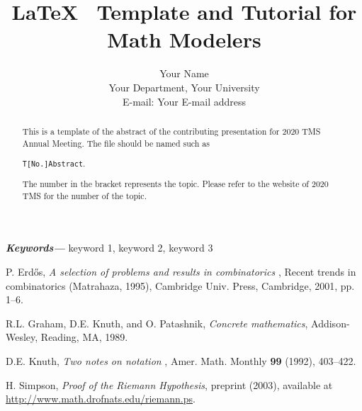\documentclass[12pt]{article}   %
\providecommand{\keywords}[1]
{
  \small	
  \textbf{\textit{Keywords---}} #1
}
\begin{document}

\title{  LaTeX \, Template and Tutorial for Math Modelers  }

\author{Your Name\\
        \small{ Your Department, Your University }\\
        \small{ E-mail: Your E-mail address }
        }
        
\date{} %

\maketitle

\thispagestyle{empty}

\begin{abstract}
This is a template of the abstract of the contributing presentation for 2020 TMS Annual Meeting. The file should be named such as
 \begin{center}{\tt T[No.]\textunderscore Abstract}.\end{center}
 \noindent The number in the bracket represents the topic. Please refer to the website of 2020 TMS for the number of the topic.\\
\end{abstract}

\keywords{   keyword 1, keyword 2, keyword 3    }

\begin{thebibliography}{99}  %
\bibitem{ } 
P. Erd\H os, 
\emph{ A selection of problems and results in combinatorics },  
Recent trends in combinatorics (Matrahaza, 1995),  
Cambridge Univ. Press, 
Cambridge, 2001, pp. 1--6.

\bibitem{ }
R.L. Graham, D.E. Knuth, and O. Patashnik, 
\emph{Concrete mathematics}, 
Addison-Wesley, 
Reading, MA, 1989.

\bibitem{ } 
D.E. Knuth, 
\emph{   Two notes on notation  }, 
Amer. Math. Monthly \textbf{99} (1992), 403--422.

\bibitem{ } 
H. Simpson, 
\emph{Proof of the Riemann Hypothesis},  
preprint (2003), available at 
\url{http://www.math.drofnats.edu/riemann.ps}.

\end{thebibliography}
\end{document}
